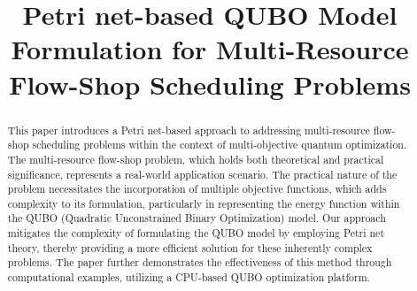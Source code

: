 \documentclass[conference]{IEEEtran}
\begin{document}
\title{Petri net-based QUBO Model Formulation for Multi-Resource Flow-Shop Scheduling Problems}

\author{
\and
{}
\and
{}
\and
{}
}

\maketitle

\begin{abstract}
This paper introduces a Petri net-based approach to addressing multi-resource flow-shop scheduling problems within the context of multi-objective quantum optimization. The multi-resource flow-shop problem, which holds both theoretical and practical significance, represents a real-world application scenario. The practical nature of the problem necessitates the incorporation of multiple objective functions, which adds complexity to its formulation, particularly in representing the energy function within the QUBO (Quadratic Unconstrained Binary Optimization) model.
Our approach mitigates the complexity of formulating the QUBO model by employing Petri net theory, thereby providing a more efficient solution for these inherently complex problems. The paper further demonstrates the effectiveness of this method through computational examples, utilizing a CPU-based QUBO optimization platform.
\end{abstract}
\end{document}
